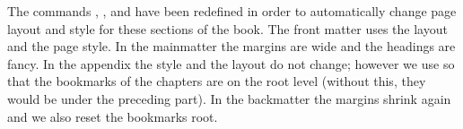 The commands , , and
 have been redefined in order to automatically
change page layout and style for these sections of the book. The front
matter uses the  layout and the  page
style. In the mainmatter the margins are wide and the headings are
fancy. In the appendix the style and the layout do not change; however
we use  so that the bookmarks of
the chapters are on the root level (without this, they would be under
the preceding part). In the backmatter the margins shrink again and we
also reset the bookmarks root.
